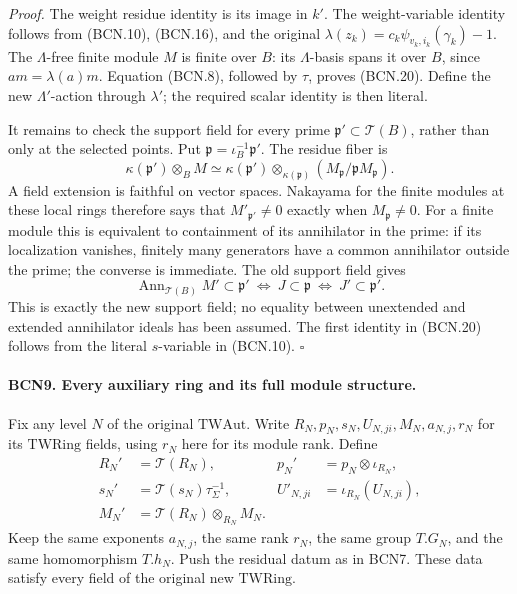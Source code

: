 \emph{Proof.}
The weight residue identity is its image in \(k'\).
The weight-variable identity follows from (BCN.10),
(BCN.16), and the original
\(\lambda(z_k)=c_k\psi_{v_k,i_k}(\gamma_k)-1\).
The \(\Lambda\)-free finite module \(M\) is finite over \(B\):
its \(\Lambda\)-basis spans it over \(B\), since
\(a m=\lambda(a)m\).  Equation (BCN.8), followed by \(\tau\),
proves (BCN.20).  Define the new \(\Lambda'\)-action through
\(\lambda'\); the required scalar identity is then literal.

It remains to check the support field for every prime
\(\mathfrak p'\subset\mathscr T(B)\), rather than only at
the selected points.  Put \(\mathfrak p=\iota_B^{-1}\mathfrak p'\).
The residue fiber is
\[
 \kappa(\mathfrak p')\otimes_B M
 \simeq\kappa(\mathfrak p')\otimes_{\kappa(\mathfrak p)}
       (M_{\mathfrak p}/\mathfrak pM_{\mathfrak p}).
\]
A field extension is faithful on vector spaces.  Nakayama
for the finite modules at these local rings therefore says
that \(M'_{\mathfrak p'}\ne0\) exactly when \(M_{\mathfrak p}\ne0\).
For a finite module this is equivalent to containment of its
annihilator in the prime: if its localization vanishes, finitely
many generators have a common annihilator outside the prime;
the converse is immediate.  The old support field gives
\[
 \operatorname{Ann}_{\mathscr T(B)}M'\subset\mathfrak p'
 \ \Longleftrightarrow\
 J\subset\mathfrak p
 \ \Longleftrightarrow\
 J'\subset\mathfrak p'.                                       \tag{BCN.21}
\]
This is exactly the new support field; no equality between
unextended and extended annihilator ideals has been assumed.
The first identity in (BCN.20) follows from the literal
\(s\)-variable in (BCN.10).
\hfill\(\square\)

\paragraph{BCN9. Every auxiliary ring and its full module structure.}\label{claim:BCN9}
Fix any level \(N\) of the original \(\mathrm{TWAut}\).
Write \(R_N,p_N,s_N,U_{N,ji},M_N,a_{N,j},r_N\) for its
\(\mathrm{TWRing}\) fields, using \(r_N\) here for its module
rank.  Define
\[
 \begin{aligned}
 R_N'&=\mathscr T(R_N),&
 p_N'&=p_N\otimes\iota_{R_N},\\
 s_N'&=\mathscr T(s_N)\tau_\Sigma^{-1},&
 U'_{N,ji}&=\iota_{R_N}(U_{N,ji}),\\
 M_N'&=\mathscr T(R_N)\otimes_{R_N}M_N .
 \end{aligned}                                                   \tag{BCN.22}
\]
Keep the same exponents \(a_{N,j}\), the same rank \(r_N\),
the same group \(T.G_N\), and the same homomorphism \(T.h_N\).
Push the residual datum as in BCN7.  These data satisfy every
field of the original new \(\mathrm{TWRing}\).

